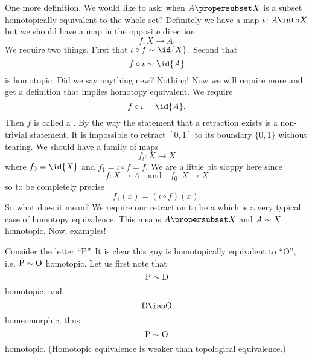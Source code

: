 One more definition. We would like to ask: when $A\propersubset
X$ is a subset homotopically equivalent to the whole set?
Definitely we have a map $\iota\colon A\into X$ but we should have a map in the
opposite direction
\begin{equation}
f\colon X\to A.
\end{equation}
We require two things.
First that $\iota\circ f\homotopic\id{X}$. Second that
\begin{equation}
f\circ \iota\homotopic\id{A}
\end{equation}
is homotopic. Did we say anything new? Nothing! Now we will
require more and get a definition that implies homotopy
equivalent. We require
\begin{equation}
f\circ\iota=\id{A}.
\end{equation}
Then $f$ is called a
. By the way the
statement that a retraction exists is a non-trivial statement. It
is impossible to retract $[0,1]$ to its boundary $\{0,1\}$
without tearing. We should have a family of maps 
\begin{equation}
f_{t}\colon X\to X
\end{equation}
where $f_{0}=\id{X}$ and $f_{1}=\iota\circ f=f$. We are a little
bit sloppy here since 
\begin{equation}
f\colon X\to A\quad\mbox{and}\quad f_{0}\colon X\to X
\end{equation}
so to be completely precise
\begin{equation}
f_{1}(x)=(\iota\circ f)(x).
\end{equation}
So what does it mean? We require our retraction to be a
which is a very typical case of homotopy equivalence. This means
$A\propersubset X$ and $A\sim X$ homotopic. Now, examples!

Consider the letter ``P''. It is clear this guy is homotopically
equivalent to ``O'', i.e. $\mbox{P}\sim\mbox{O}$
homotopic. Let us first note that
\begin{equation}
\mbox{P}\sim\mbox{D}
\end{equation}
homotopic, and
\begin{equation}
\mbox{D}\iso\mbox{O}
\end{equation}
homeomorphic, thus
\begin{equation}
\mbox{P}\sim\mbox{O}
\end{equation}
homotopic. (Homotopic equivalence is weaker than topological
equivalence.)

